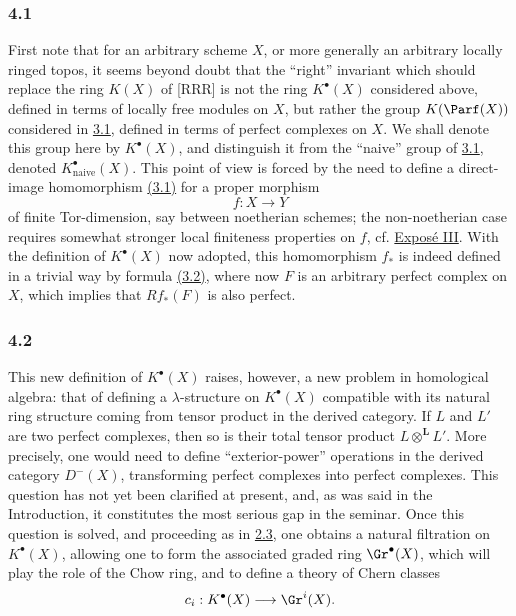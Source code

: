 \subsubsection*{4.1}
First note that for an arbitrary scheme $X$, or more generally an arbitrary locally ringed topos, it seems beyond doubt that the ``right'' invariant which should replace the ring $K(X)$ of [RRR] is not the ring $K^\bullet(X)$ considered above, defined in terms of locally free modules on $X$, but rather the group $K(\Parf(X))$ considered in \hyperlink{sga6.e00.sec.3.1}{3.1}, defined in terms of perfect complexes on $X$. We shall denote this group here by $K^\bullet(X)$, and distinguish it from the ``naive'' group of \hyperlink{sga6.e00.sec.3.1}{3.1}, denoted $K^\bullet_{\mathrm{naive}}(X)$. This point of view is forced by the need to define a direct-image homomorphism \hyperlink{sga6.e00.eq.3-1}{(3.1)} for a proper morphism
\[
f:X\longrightarrow Y
\]
of finite Tor-dimension, say between noetherian schemes; the non-noetherian case requires somewhat stronger local finiteness properties on $f$, cf. \hyperlink{sga6.e03.expose}{Expos\'e III}. With the definition of $K^\bullet(X)$ now adopted, this homomorphism $f_*$ is indeed defined in a trivial way by formula \hyperlink{sga6.e00.sec.3.2}{(3.2)}, where now $F$ is an arbitrary perfect complex on $X$, which implies that $Rf_*(F)$ is also perfect.

\subsubsection*{4.2}
This new definition of $K^\bullet(X)$ raises, however, a new problem in homological algebra: that of defining a $\lambda$-structure on $K^\bullet(X)$ compatible with its natural ring structure coming from tensor product in the derived category. If $L$ and $L'$ are two perfect complexes, then so is their total tensor product $L\otimes^{\mathbf L}L'$. More precisely, one would need to define ``exterior-power'' operations in the derived category $D^-(X)$, transforming perfect complexes into perfect complexes. This question has not yet been clarified at present, and, as was said in the Introduction, it constitutes the most serious gap in the seminar. Once this question is solved, and proceeding as in \hyperlink{sga6.e00.sec.2.3}{2.3}, one obtains a natural filtration on $K^\bullet(X)$, allowing one to form the associated graded ring $\Gr^\bullet(X)$, which will play the role of the Chow ring, and to define a theory of Chern classes
\[
c_i:K^\bullet(X)\longrightarrow \Gr^i(X).
\]

